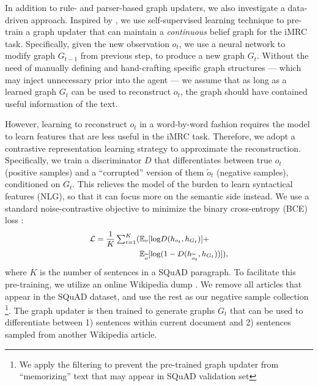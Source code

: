 \documentclass[11pt]{article}
\newcommand{\imrc}{iMRC\xspace}
\newcommand{\squad}{SQuAD\xspace}
\begin{document}
In addition to rule- and parser-based graph updaters, we also investigate a data-driven approach.
Inspired by \citet{adhikari2020gata}, we use self-supervised learning technique to pre-train a graph updater that can maintain a \emph{continuous} belief graph for the \imrc task.
Specifically, given the new observation $o_t$, we use a neural network to modify graph $G_{t-1}$ from previous step, to produce a new graph $G_t$.
Without the need of manually defining and hand-crafting specific graph structures --- which may inject unnecessary prior into the agent ---
we assume that as long as a learned graph $G_t$ can be used to reconstruct $o_t$, the graph should have contained useful information of the text.

However, learning to reconstruct $o_t$ in a word-by-word fashion requires the model to learn features that are less useful in the \imrc task.
Therefore, we adopt a contrastive representation learning strategy to approximate the reconstruction. 
Specifically, we train a discriminator $D$ that differentiates between true $o_t$ (positive samples) and a ``corrupted'' version of them $\widetilde{o}_t$ (negative samples), conditioned on $G_t$.
This relieves the model of the burden to learn syntactical features (NLG), so that it can focus more on the semantic side instead.
We use a standard noise-contrastive objective to minimize the binary cross-entropy (BCE) loss \citep{velickovic2018deep}:
\begin{equation}
    \small
    \begin{aligned}
        \mathcal{L} = \frac{1}{K} \textstyle\sum_{t=1}^{K} (
            &\mathbb{E}_{o} [ \text{log} D( h_{o_t}, h_{G_t} ) ]  +\\
            &\mathbb{E}_{\widetilde{o}} [ \text{log} (1 - D( h_{\widetilde{o}_t}, h_{G_t} ) ) ] ),
    \end{aligned}
\end{equation}
where $K$ is the number of sentences in a \squad paragraph. 
To facilitate this pre-training, we utilize an online Wikipedia dump \citep{wilson_wiki}.
We remove all articles that appear in the \squad dataset, and use the rest as our negative sample collection \footnote{We apply the filtering to prevent the pre-trained graph updater from ``memorizing'' text that may appear in \squad validation set}.
The graph updater is then trained to generate graphs $G_t$ that can be used to differentiate between 1) sentences within current document and 2) sentences sampled from another Wikipedia article.
\end{document}
